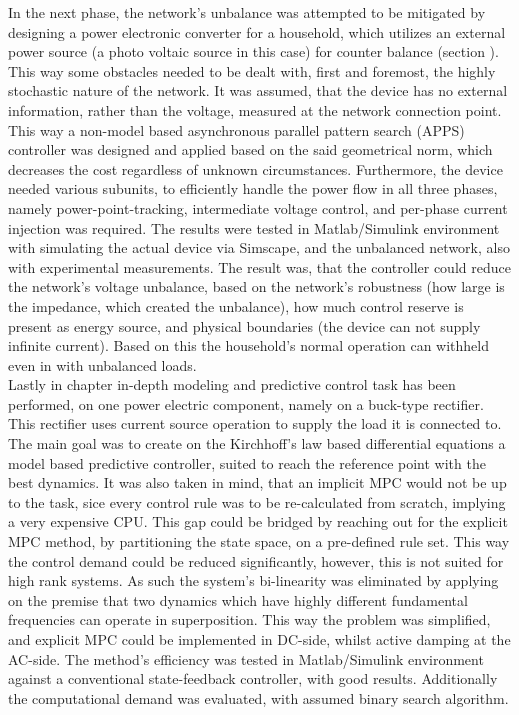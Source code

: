 In the next phase, the network's unbalance was attempted to be mitigated by designing a power electronic converter for a household, which utilizes an external power source (a photo voltaic source in this case) for counter balance (section ). This way some obstacles needed to be dealt with, first and foremost, the highly stochastic nature of the network. It was assumed, that the device has no external information, rather than the voltage, measured at the network connection point. This way a non-model based asynchronous parallel pattern search (APPS) controller was designed and applied based on the said geometrical norm, which decreases the cost regardless of unknown circumstances. Furthermore, the device needed various subunits, to efficiently handle the power flow in all three phases, namely power-point-tracking, intermediate voltage control, and per-phase current injection was required. The results were tested in Matlab/Simulink environment with simulating the actual device via Simscape, and the unbalanced network, also with experimental measurements. The result was, that the controller could reduce the network's voltage unbalance, based on the network's robustness (how large is the impedance, which created the unbalance), how much control reserve is present as energy source, and physical boundaries (the device can not supply infinite current). Based on this the household's normal operation can withheld even in with unbalanced loads.\\
Lastly in chapter  in-depth modeling and predictive control task has been performed, on one power electric component, namely on a buck-type rectifier. This rectifier uses current source operation to supply the load it is connected to. The main goal was to create on the Kirchhoff's law based differential equations a model based predictive controller, suited to reach the reference point with the best dynamics. It was also taken in mind, that an implicit MPC would not be up to the task, sice every control rule was to be re-calculated from scratch, implying a very expensive CPU. This gap could be bridged by reaching out for the explicit MPC method, by partitioning the state space, on a pre-defined rule set. This way the control demand could be reduced significantly, however, this is not suited for high rank systems. As such the system's bi-linearity was eliminated by applying on the premise that two dynamics which have highly different fundamental frequencies can operate in superposition. This way the problem was simplified, and explicit MPC could be implemented in DC-side, whilst active damping at the AC-side. The method's efficiency was tested in Matlab/Simulink environment against a conventional state-feedback controller, with good results. Additionally the computational demand was evaluated, with assumed binary search algorithm.\\

